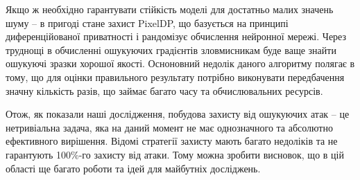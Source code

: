 \documentclass[14pt,a4paper]{extarticle}
\newcounter{e}
\numberwithin{equation}{section}
\numberwithin{figure}{section}
\begin{document}
 Якщо ж необхідно гарантувати стійкість моделі для достатньо малих значень шуму -- в пригоді стане захист PixelDP, що базується на принципі диференційованої приватності і рандомізує обчислення нейронної мережі. Через труднощі в обчисленні ошукуючих градієнтів зловмисникам буде ваще знайти ошукуючі зразки хорошої якості. Осноновний недолік даного алгоритму полягає в тому, що для оцінки правильного результату потрібно виконувати передбачення значну кількість разів, що займає багато часу та обчислювальних ресурсів. 
 
 Отож, як показали наші дослідження, побудова захисту від ошукуючих атак -- це нетривіальна задача, яка на даний момент не має однозначного та абсолютно ефективного вирішення. Відомі стратегії захисту мають багато недоліків та не гарантують 100\%-го захисту від атаки. Тому можна зробити висновок, що в цій області ще багато роботи та ідей для майбутніх досліджень.
 
 
 
 
 
 
 \newpage
 \thispagestyle{empty}
\end{document}
